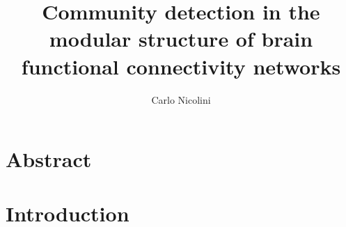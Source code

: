 
%

\title{Community detection in the modular structure of brain functional connectivity networks}
\author{Carlo Nicolini}


\newtheorem{obs}{Observation}
\newtheorem{props}{Proposition}
\newenvironment{bottompar}{\par\vspace*{\fill}}{\clearpage}


%

\maketitle
{}

\tableofcontents
\listoftodos

%

%

%


\chapter*{Abstract}


\chapter{Introduction}\label{chap:introduction}


% 

